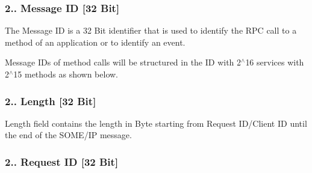  \subsubsection*{2.. Message ID \mbox{[}32 Bit\mbox{]}}


\begin{DoxyItemize}
\item The Message ID is a 32 Bit identifier that is used to identify the R\+PC call to a method of an application or to identify an event.
\item Message I\+Ds of method calls will be structured in the ID with 2$^\wedge$16 services with 2$^\wedge$15 methods as shown below. 
\end{DoxyItemize}

\subsubsection*{2.. Length \mbox{[}32 Bit\mbox{]}}


\begin{DoxyItemize}
\item Length field contains the length in Byte starting from Request I\+D/\+Client ID until the end of the S\+O\+M\+E/\+IP message.
\end{DoxyItemize}

\subsubsection*{2.. Request ID \mbox{[}32 Bit\mbox{]}}


